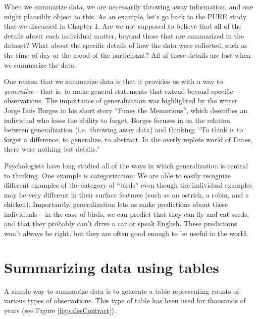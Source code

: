 \documentclass[
  12pt,
]{book}
\begin{document}
When we summarize data, we are necessarily throwing away information, and one might plausibly object to this. As an example, let's go back to the PURE study that we discussed in Chapter 1. Are we not supposed to believe that all of the details about each individual matter, beyond those that are summarized in the dataset? What about the specific details of how the data were collected, such as the time of day or the mood of the participant? All of these details are lost when we summarize the data.

One reason that we summarize data is that it provides us with a way to \emph{generalize} - that is, to make general statements that extend beyond specific observations. The importance of generalization was highlighted by the writer Jorge Luis Borges in his short story ``Funes the Memorious'', which describes an individual who loses the ability to forget. Borges focuses in on the relation between generalization (i.e.~throwing away data) and thinking: ``To think is to forget a difference, to generalize, to abstract. In the overly replete world of Funes, there were nothing but details.''

Psychologists have long studied all of the ways in which generalization is central to thinking. One example is categorization: We are able to easily recognize different examples of the category of ``birds'' even though the individual examples may be very different in their surface features (such as an ostrich, a robin, and a chicken). Importantly, generalization lets us make predictions about these individuals -- in the case of birds, we can predict that they can fly and eat seeds, and that they probably can't drive a car or speak English. These predictions won't always be right, but they are often good enough to be useful in the world.

\hypertarget{summarizing-data-using-tables}{%
\section{Summarizing data using tables}\label{summarizing-data-using-tables}}

A simple way to summarize data is to generate a table representing counts of various types of observations. This type of table has been used for thousands of years (see Figure \ref{fig:salesContract}).
\end{document}
